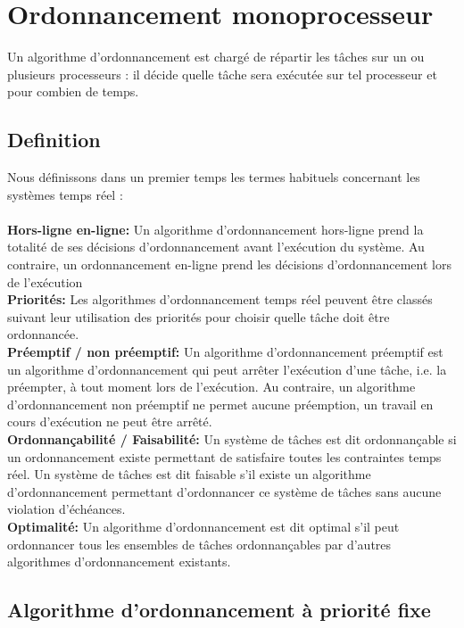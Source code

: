 \section{Ordonnancement monoprocesseur}
\vspace{-1cm}
Un algorithme d’ordonnancement est chargé de répartir les tâches sur un ou plusieurs processeurs : il décide quelle tâche sera exécutée sur tel processeur et pour combien de temps. 
\subsection*{Definition}
\vspace{-1cm}
Nous définissons dans un premier temps les termes habituels concernant les systèmes temps réel : \\
\\ \indent \textbf{Hors-ligne en-ligne:} Un algorithme d’ordonnancement hors-ligne prend la totalité de ses décisions d’ordonnancement avant l’exécution du système. Au contraire, un ordonnancement en-ligne prend les décisions d’ordonnancement lors de l’exécution 
\\ \indent \textbf{Priorités:} Les algorithmes d’ordonnancement temps réel peuvent être classés suivant leur utilisation des priorités pour choisir quelle tâche doit être ordonnancée.
\\ \indent \textbf{Préemptif / non préemptif:} Un algorithme d’ordonnancement préemptif est un algorithme d’ordonnancement qui peut arrêter l’exécution d’une tâche, i.e. la préempter, à tout moment lors de l’exécution. Au contraire, un algorithme d’ordonnancement non préemptif ne permet aucune préemption, un travail en cours d’exécution ne peut être arrêté.
\\ \indent \textbf{Ordonnançabilité / Faisabilité:} Un système de tâches est dit ordonnançable si un ordonnancement existe permettant de satisfaire toutes les contraintes temps réel. Un système de tâches est dit faisable s’il existe un algorithme d’ordonnancement permettant d’ordonnancer ce système de tâches sans aucune violation d’échéances.
\\ \indent \textbf{Optimalité:} Un algorithme d’ordonnancement est dit optimal s’il peut ordonnancer tous les ensembles de tâches ordonnançables par d’autres algorithmes d’ordonnancement existants.

\subsection{Algorithme d’ordonnancement à priorité fixe}
